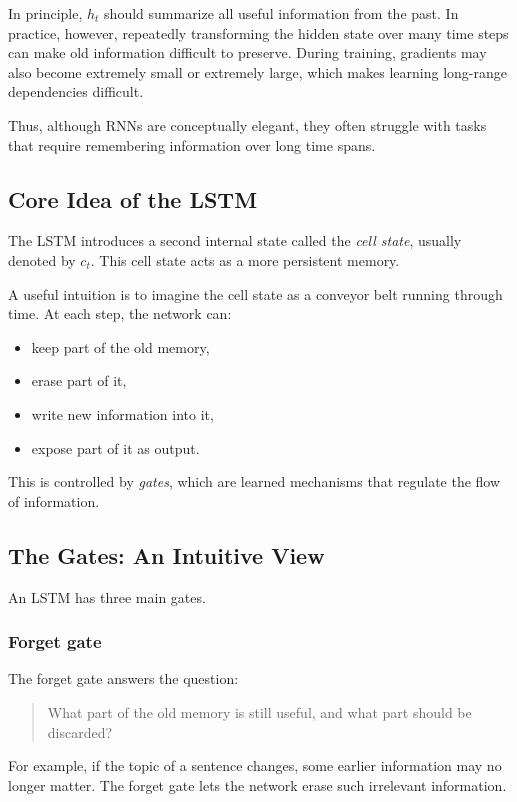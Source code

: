 In principle, \(h_t\) should summarize all useful information from the past. In practice, however, repeatedly transforming the hidden state over many time steps can make old information difficult to preserve. During training, gradients may also become extremely small or extremely large, which makes learning long-range dependencies difficult.

Thus, although RNNs are conceptually elegant, they often struggle with tasks that require remembering information over long time spans.

\subsection{Core Idea of the LSTM}

The LSTM introduces a second internal state called the \emph{cell state}, usually denoted by \(c_t\). This cell state acts as a more persistent memory.

A useful intuition is to imagine the cell state as a conveyor belt running through time. At each step, the network can:
\begin{itemize}
    \item keep part of the old memory,
    \item erase part of it,
    \item write new information into it,
    \item expose part of it as output.
\end{itemize}

This is controlled by \emph{gates}, which are learned mechanisms that regulate the flow of information.

\subsection{The Gates: An Intuitive View}

An LSTM has three main gates.

\subsubsection{Forget gate}

The forget gate answers the question:
\begin{quote}
What part of the old memory is still useful, and what part should be discarded?
\end{quote}

For example, if the topic of a sentence changes, some earlier information may no longer matter. The forget gate lets the network erase such irrelevant information.

